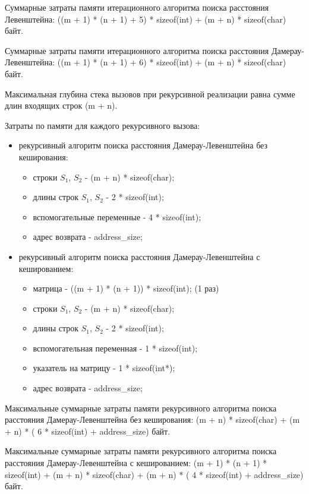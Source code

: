 Суммарные затраты памяти итерационного алгоритма поиска расстояния Левенштейна:
((m + 1) * (n + 1) + 5) * sizeof(int) + (m + n) * sizeof(char) байт.

Суммарные затраты памяти итерационного алгоритма поиска расстояния Дамерау-Левенштейна:
((m + 1) * (n + 1) + 6) * sizeof(int) + (m + n) * sizeof(char) байт.


Максимальная глубина стека вызовов при рекурсивной реализации равна сумме длин входящих строк (m + n).

Затраты по памяти для каждого рекурсивного вызова:
\begin{itemize}
	\item рекурсивный алгоритм поиска расстояния Дамерау-Левенштейна без кеширования:\begin{itemize}
		\item строки $S_1$, $S_2$ - (m + n) * sizeof(char);
		\item длины строк $S_1$, $S_2$ - 2 * sizeof(int);
		\item вспомогательные переменные -  4 * sizeof(int);
		\item адрес возврата - address\_size;
	\end{itemize}
	\item рекурсивный алгоритм поиска расстояния Дамерау-Левенштейна с кешированием: \begin{itemize}
	    \item матрица - ((m + 1) * (n + 1)) * sizeof(int); (1 раз)
		\item строки $S_1$, $S_2$ - (m + n) * sizeof(char);
		\item длины строк $S_1$, $S_2$ - 2 * sizeof(int);
		\item вспомогательная переменная -  1 * sizeof(int);
		\item указатель на матрицу - 1 * sizeof(int*);
		\item адрес возврата - address\_size;
	\end{itemize}
\end{itemize}

Максимальные суммарные затраты памяти рекурсивного алгоритма поиска расстояния Дамерау-Левенштейна без кеширования: (m + n) * sizeof(char) + (m + n) * ( 6 * sizeof(int) + address\_size) байт.

Максимальные суммарные затраты памяти рекурсивного алгоритма поиска расстояния Дамерау-Левенштейна с кешированием: (m + 1) * (n + 1) * sizeof(int) + (m + n) * sizeof(char) + (m + n) * ( 4 * sizeof(int) + address\_size) байт.


